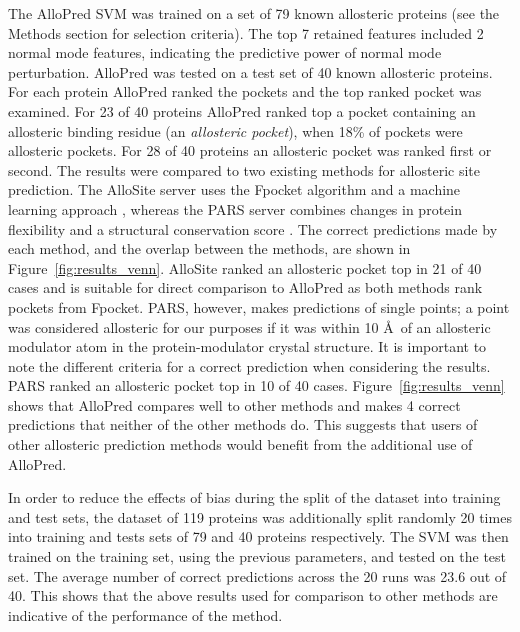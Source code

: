 The AlloPred SVM was trained on a set of 79 known allosteric proteins (see the Methods section for selection criteria).
The top 7 retained features included 2 normal mode features, indicating the predictive power of normal mode perturbation.
AlloPred was tested on a test set of 40 known allosteric proteins.
For each protein AlloPred ranked the pockets and the top ranked pocket was examined.
For 23 of 40 proteins AlloPred ranked top a pocket containing an allosteric binding residue (an \emph{allosteric pocket}), when 18\% of pockets were allosteric pockets.
For 28 of 40 proteins an allosteric pocket was ranked first or second.
The results were compared to two existing methods for allosteric site prediction.
The AlloSite server uses the Fpocket algorithm and a machine learning approach \cite{Huang2013}, whereas the PARS server combines changes in protein flexibility and a structural conservation score \cite{Panjkovich2014}.
The correct predictions made by each method, and the overlap between the methods, are shown in Figure~\ref{fig:results_venn}.
AlloSite ranked an allosteric pocket top in 21 of 40 cases and is suitable for direct comparison to AlloPred as both methods rank pockets from Fpocket.
PARS, however, makes predictions of single points; a point was considered allosteric for our purposes if it was within 10 \AA\ of an allosteric modulator atom in the protein-modulator crystal structure.
It is important to note the different criteria for a correct prediction when considering the results.
PARS ranked an allosteric pocket top in 10 of 40 cases.
Figure~\ref{fig:results_venn} shows that AlloPred compares well to other methods and makes 4 correct predictions that neither of the other methods do.
This suggests that users of other allosteric prediction methods would benefit from the additional use of AlloPred.

In order to reduce the effects of bias during the split of the dataset into training and test sets, the dataset of 119 proteins was additionally split randomly 20 times into training and tests sets of 79 and 40 proteins respectively.
The SVM was then trained on the training set, using the previous parameters, and tested on the test set.
The average number of correct predictions across the 20 runs was 23.6 out of 40.
This shows that the above results used for comparison to other methods are indicative of the performance of the method.


